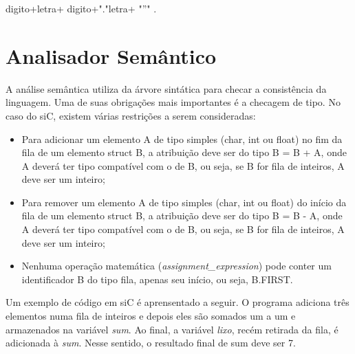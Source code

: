 \documentclass[12pt]{article}
\begin{document}
{digito}+{letra}+
{digito}+"."{letra}+
"''"
.




\section{Analisador Semântico}

\indent A análise semântica utiliza da árvore sintática para checar a consistência da linguagem. Uma de suas obrigações mais importantes é a checagem de tipo. No caso do siC, existem várias restrições a serem consideradas:
\begin{itemize}
    \item Para adicionar um elemento A de tipo simples (char, int ou float) no fim da fila de um elemento struct B, a atribuição deve ser do tipo B = B + A, onde A deverá ter tipo compatível com o de B, ou seja, se B for fila de inteiros, A deve ser um inteiro;
    \item Para remover um elemento A de tipo simples (char, int ou float) do início da fila de um elemento struct B, a atribuição deve ser do tipo B = B - A, onde A deverá ter tipo compatível com o de B, ou seja, se B for fila de inteiros, A deve ser um inteiro;
    \item Nenhuma operação matemática (\textit{assignment\_expression}) pode conter um identificador B do tipo fila, apenas seu início, ou seja, B.FIRST.
\end{itemize}

\indent Um exemplo de código em siC é aprensentado a seguir. O programa adiciona três elementos numa fila de inteiros e depois eles são somados um a um e armazenados na variável \textit{sum}. Ao final, a variável \textit{lixo}, recém retirada da fila, é adicionada à \textit{sum}. Nesse sentido, o resultado final de sum deve ser 7. \\
\end{document}
